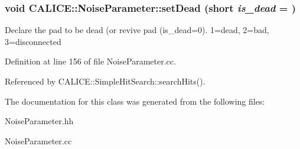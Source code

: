 \subsubsection[{setDead}]{\setlength{\rightskip}{0pt plus 5cm}void CALICE::NoiseParameter::setDead (short {\em is\_\-dead} = {})}\label{classCALICE_1_1NoiseParameter_acb1d520b046f2365c182a492540a6881}


Declare the pad to be dead (or revive pad (is\_\-dead=0). 1=dead, 2=bad, 3=disconnected 

Definition at line 156 of file NoiseParameter.cc.

Referenced by CALICE::SimpleHitSearch::searchHits().

The documentation for this class was generated from the following files:\begin{DoxyCompactItemize}
\item 
NoiseParameter.hh\item 
NoiseParameter.cc\end{DoxyCompactItemize}
